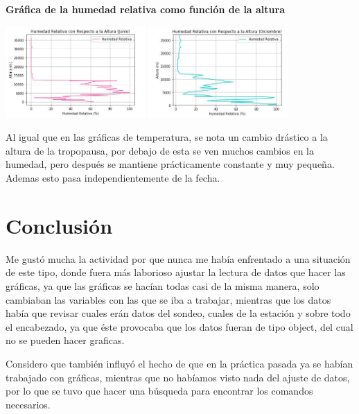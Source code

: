 \documentclass{article}
\begin{document}
\textbf{Gráfica de la humedad relativa como función de la altura}
\begin{center}
    \includegraphics[width=0.4\textwidth]{HumedadJ.JPG}
    \includegraphics[width=0.4\textwidth]{HumedadD.JPG}
\end{center}
Al igual que en las gráficas de temperatura, se nota un cambio drástico a la altura de la tropopausa, por debajo de esta se ven muchos cambios en la humedad, pero después se mantiene prácticamente constante y muy pequeña. Ademas esto pasa independientemente de la fecha.

\section{Conclusión}
Me gustó mucha la actividad por que nunca me había enfrentado a una situación de este tipo, donde fuera más laborioso ajustar la lectura de datos que hacer las gráficas, ya que las gráficas se hacían todas casi de la misma manera, solo cambiaban las variables con las que se iba a trabajar, mientras que los datos había que revisar cuales erán datos del sondeo, cuales de la estación y sobre todo el encabezado, ya que éste provocaba que los datos fueran de tipo object, del cual no se pueden hacer graficas.

Considero que también influyó el hecho de que en la práctica pasada ya se habían trabajado con gráficas, mientras que no habíamos visto nada del ajuste de datos, por lo que se tuvo que hacer una búsqueda para encontrar los comandos necesarios.
\end{document}
